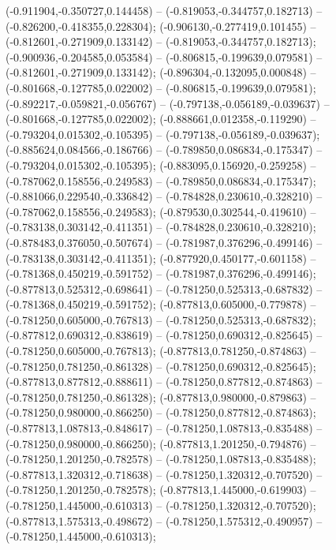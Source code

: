  (-0.911904,-0.350727,0.144458) -- (-0.819053,-0.344757,0.182713) -- (-0.826200,-0.418355,0.228304);
 (-0.906130,-0.277419,0.101455) -- (-0.812601,-0.271909,0.133142) -- (-0.819053,-0.344757,0.182713);
 (-0.900936,-0.204585,0.053584) -- (-0.806815,-0.199639,0.079581) -- (-0.812601,-0.271909,0.133142);
 (-0.896304,-0.132095,0.000848) -- (-0.801668,-0.127785,0.022002) -- (-0.806815,-0.199639,0.079581);
 (-0.892217,-0.059821,-0.056767) -- (-0.797138,-0.056189,-0.039637) -- (-0.801668,-0.127785,0.022002);
 (-0.888661,0.012358,-0.119290) -- (-0.793204,0.015302,-0.105395) -- (-0.797138,-0.056189,-0.039637);
 (-0.885624,0.084566,-0.186766) -- (-0.789850,0.086834,-0.175347) -- (-0.793204,0.015302,-0.105395);
 (-0.883095,0.156920,-0.259258) -- (-0.787062,0.158556,-0.249583) -- (-0.789850,0.086834,-0.175347);
 (-0.881066,0.229540,-0.336842) -- (-0.784828,0.230610,-0.328210) -- (-0.787062,0.158556,-0.249583);
 (-0.879530,0.302544,-0.419610) -- (-0.783138,0.303142,-0.411351) -- (-0.784828,0.230610,-0.328210);
 (-0.878483,0.376050,-0.507674) -- (-0.781987,0.376296,-0.499146) -- (-0.783138,0.303142,-0.411351);
 (-0.877920,0.450177,-0.601158) -- (-0.781368,0.450219,-0.591752) -- (-0.781987,0.376296,-0.499146);
 (-0.877813,0.525312,-0.698641) -- (-0.781250,0.525313,-0.687832) -- (-0.781368,0.450219,-0.591752);
 (-0.877813,0.605000,-0.779878) -- (-0.781250,0.605000,-0.767813) -- (-0.781250,0.525313,-0.687832);
 (-0.877812,0.690312,-0.838619) -- (-0.781250,0.690312,-0.825645) -- (-0.781250,0.605000,-0.767813);
 (-0.877813,0.781250,-0.874863) -- (-0.781250,0.781250,-0.861328) -- (-0.781250,0.690312,-0.825645);
 (-0.877813,0.877812,-0.888611) -- (-0.781250,0.877812,-0.874863) -- (-0.781250,0.781250,-0.861328);
 (-0.877813,0.980000,-0.879863) -- (-0.781250,0.980000,-0.866250) -- (-0.781250,0.877812,-0.874863);
 (-0.877813,1.087813,-0.848617) -- (-0.781250,1.087813,-0.835488) -- (-0.781250,0.980000,-0.866250);
 (-0.877813,1.201250,-0.794876) -- (-0.781250,1.201250,-0.782578) -- (-0.781250,1.087813,-0.835488);
 (-0.877813,1.320312,-0.718638) -- (-0.781250,1.320312,-0.707520) -- (-0.781250,1.201250,-0.782578);
 (-0.877813,1.445000,-0.619903) -- (-0.781250,1.445000,-0.610313) -- (-0.781250,1.320312,-0.707520);
 (-0.877813,1.575313,-0.498672) -- (-0.781250,1.575312,-0.490957) -- (-0.781250,1.445000,-0.610313);
